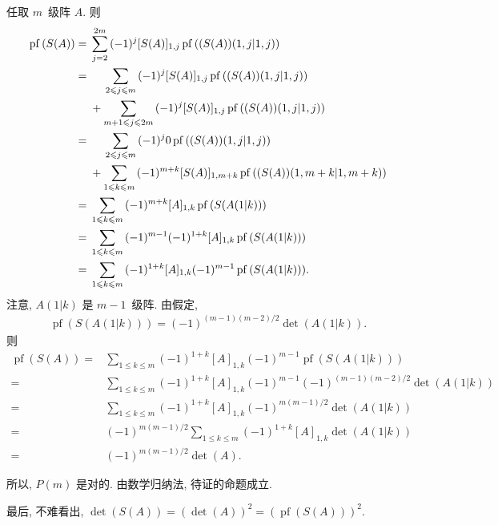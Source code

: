 \documentclass[../libro.tex]{subfiles}
\begin{document}
\begin{example}
    任取 \(m\)~级阵 \(A\).
    则
    \begin{align*}
        \operatorname{pf} {(S(A))}
        = {} &
        \sum_{j=2}^{2m}
        {(-1)^j [S(A)]_{1,j} \operatorname{pf} {((S(A))({1,j}|{1,j}))}}
        \\
        = {} &
        \hphantom{{} + {}}
        \sum_{2 \leq j \leq m}
        {(-1)^j [S(A)]_{1,j} \operatorname{pf} {((S(A))({1,j}|{1,j}))}}
        \\
        & +
        \sum_{m+1 \leq j \leq 2m}
        {(-1)^j [S(A)]_{1,j} \operatorname{pf} {((S(A))({1,j}|{1,j}))}}
        \\
        = {} &
        \hphantom{{} + {}}
        \sum_{2 \leq j \leq m}
        {(-1)^j 0 \operatorname{pf} {((S(A))({1,j}|{1,j}))}}
        \\
        & +
        \sum_{1 \leq k \leq m}
        {(-1)^{m+k} [S(A)]_{1,m+k}
        \operatorname{pf} {((S(A))({1,m+k}|{1,m+k}))}}
        \\
        = {} &
        \sum_{1 \leq k \leq m}
        {(-1)^{m+k} [A]_{1,k}
        \operatorname{pf} {(S(A(1|k)))}}
        \\
        = {} &
        \sum_{1 \leq k \leq m}
        {(-1)^{m-1} (-1)^{1+k} [A]_{1,k}
        \operatorname{pf} {(S(A(1|k)))}}
        \\
        = {} &
        \sum_{1 \leq k \leq m}
        {(-1)^{1+k} [A]_{1,k}
        (-1)^{m-1} \operatorname{pf} {(S(A(1|k)))}}.
    \end{align*}
    注意, \(A(1|k)\) 是 \(m-1\)~级阵.
    由假定,
    \begin{align*}
        \operatorname{pf} {(S(A(1|k)))}
        = (-1)^{(m-1)(m-2)/2} \det {(A(1|k))}.
    \end{align*}
    则
    \begin{align*}
        \operatorname{pf} {(S(A))}
        = {} &
        \sum_{1 \leq k \leq m}
        {(-1)^{1+k} [A]_{1,k}
        (-1)^{m-1} \operatorname{pf} {(S(A(1|k)))}}
        \\
        = {} &
        \sum_{1 \leq k \leq m}
        {(-1)^{1+k} [A]_{1,k}
        (-1)^{m-1} (-1)^{(m-1)(m-2)/2} \det {(A(1|k))}}
        \\
        = {} &
        \sum_{1 \leq k \leq m}
        {(-1)^{1+k} [A]_{1,k}
        (-1)^{m(m-1)/2} \det {(A(1|k))}}
        \\
        = {} &
        (-1)^{m(m-1)/2}
        \sum_{1 \leq k \leq m}
        {(-1)^{1+k} [A]_{1,k}
        \det {(A(1|k))}}
        \\
        = {} &
        (-1)^{m(m-1)/2} \det {(A)}.
    \end{align*}

    所以, \(P(m)\) 是对的.
    由数学归纳法, 待证的命题成立.

    最后, 不难看出,
    \(\det {(S(A))} = (\det {(A)})^2
    = (\operatorname{pf} {(S(A))})^2\).
\end{example}
\end{document}
